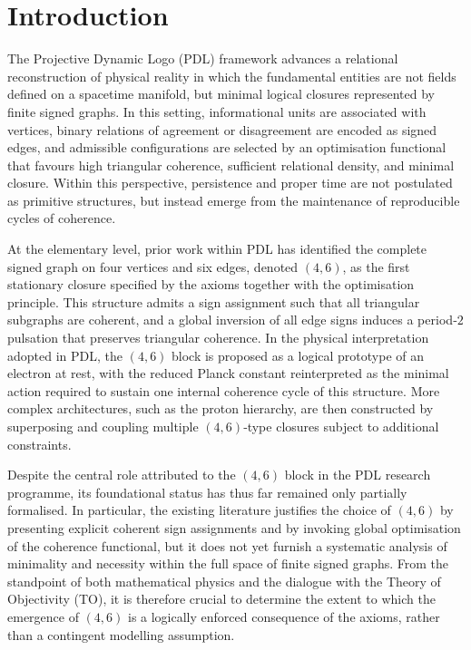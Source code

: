 \documentclass[11pt,a4paper]{article}
\theoremstyle{definition}
\begin{document}
\section{Introduction}

The Projective Dynamic Logo (PDL) framework advances a relational reconstruction of physical reality in which the fundamental entities are not fields defined on a spacetime manifold, but minimal logical closures represented by finite signed graphs.\cite{PDL_Intro_2026,PDL_Main_2026,PDL_French_2026} In this setting, informational units are associated with vertices, binary relations of agreement or disagreement are encoded as signed edges, and admissible configurations are selected by an optimisation functional that favours high triangular coherence, sufficient relational density, and minimal closure.\cite{PDL_Intro_2026,PDL_Main_2026,PDL_TO_Dialogue_2026} Within this perspective, persistence and proper time are not postulated as primitive structures, but instead emerge from the maintenance of reproducible cycles of coherence.\cite{Proper_Time_PDL_2026}

At the elementary level, prior work within PDL has identified the complete signed graph on four vertices and six edges, denoted $(4,6)$, as the first stationary closure specified by the axioms together with the optimisation principle.\cite{PDL_Intro_2026,PDL_Main_2026} This structure admits a sign assignment such that all triangular subgraphs are coherent, and a global inversion of all edge signs induces a period‑$2$ pulsation that preserves triangular coherence.\cite{PDL_Main_2026} In the physical interpretation adopted in PDL, the $(4,6)$ block is proposed as a logical prototype of an electron at rest, with the reduced Planck constant reinterpreted as the minimal action required to sustain one internal coherence cycle of this structure.\cite{PDL_Main_2026,PDL_Global_Mapping_2026} More complex architectures, such as the proton hierarchy, are then constructed by superposing and coupling multiple $(4,6)$‑type closures subject to additional constraints.\cite{Combinatorial_Proton_v2_2026,Effective_Fields_PDL_2026}

Despite the central role attributed to the $(4,6)$ block in the PDL research programme, its foundational status has thus far remained only partially formalised. In particular, the existing literature justifies the choice of $(4,6)$ by presenting explicit coherent sign assignments and by invoking global optimisation of the coherence functional, but it does not yet furnish a systematic analysis of minimality and necessity within the full space of finite signed graphs.\cite{PDL_Intro_2026,PDL_Main_2026,PDL_TO_Dialogue_2026} From the standpoint of both mathematical physics and the dialogue with the Theory of Objectivity (TO), it is therefore crucial to determine the extent to which the emergence of $(4,6)$ is a logically enforced consequence of the axioms, rather than a contingent modelling assumption.\cite{PDL_TO_Dialogue_2026,PDL_Global_Mapping_2026}
\end{document}
